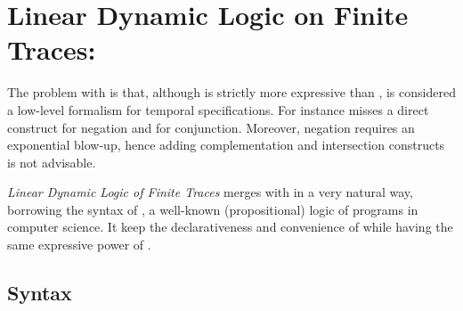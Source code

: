 \section{Linear Dynamic Logic on Finite Traces: \LDLf}
\label{sect:ldlf}
The problem with \RE is that, although is strictly more expressive than \LTLf, is considered a low-level formalism for temporal specifications. For instance \RE misses a direct construct for negation and for conjunction. Moreover, negation requires an exponential blow-up, hence adding complementation and intersection constructs is not advisable.

\emph{Linear Dynamic Logic of Finite Traces} \LDLf \citep{de2013linear} merges \LTLf with \RE in a very natural way, borrowing the syntax of \PDL \citep{FISCHER1979194}, a well-known (propositional) logic of programs in computer science. It keep the declarativeness and convenience of \LTLf while having the same expressive power of \RE. 

\subsection{Syntax}\label{ldlf-syntax}

